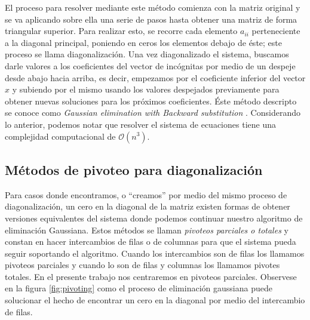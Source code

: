 El proceso para resolver mediante este método comienza con la matriz original y se va aplicando sobre ella una serie de pasos hasta obtener una matriz de forma triangular superior. Para realizar esto, se recorre cada elemento $a_{ii}$ perteneciente a la diagonal principal, poniendo en ceros los elementos debajo de éste; este proceso se llama diagonalización. Una vez diagonalizado el sistema, buscamos darle valores a los coeficientes del vector de incógnitas por medio de un despeje desde abajo hacia arriba, es decir, empezamos por el coeficiente inferior del vector $x$ y subiendo por el mismo usando los valores despejados previamente para obtener nuevas soluciones para los próximos coeficientes. Éste  método descripto se conoce como \textit{Gaussian elimination with Backward substitution} \cite{Burden11}.
Considerando lo anterior, podemos notar que resolver el sistema de ecuaciones tiene una complejidad computacional de $\mathcal{O}(n^3)$.

\subsection{Métodos de pivoteo para diagonalización}
\label{sec:pivoteo}

Para casos donde encontramos, o  ``creamos'' por medio del mismo proceso de diagonalización, un cero en la diagonal de la matriz existen formas de obtener versiones equivalentes del sistema donde podemos continuar nuestro algoritmo de eliminación Gaussiana. Estos métodos se llaman \textit{pivoteos parciales o totales} y constan en hacer intercambios de filas o de columnas para que el sistema pueda seguir soportando el algoritmo. Cuando los intercambios son de filas los llamamos pivoteos parciales y cuando lo son de filas y columnas los llamamos pivotes totales. En el presente trabajo nos centraremos en pivoteos parciales. Observese en la figura \ref{fig:pivoting} como el proceso de eliminación gaussiana puede solucionar el hecho de encontrar un cero en la diagonal por medio del intercambio de filas.

